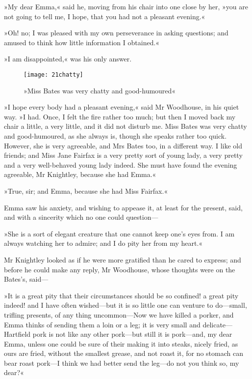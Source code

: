 »My dear Emma,« said he, moving from his chair into one close by her, »you are not going to tell me, I hope, that you had not a pleasant evening.«

»Oh! no; I was pleased with my own perseverance in asking questions; and amused to think how little information I obtained.«

»I am disappointed,« was his only answer.

\begin{figure}[tbph]
\centering
\texttt{[image: 21chatty]}
\caption{»Miss Bates was very chatty and good-humoured«}
\end{figure}

»I hope every body had a pleasant evening,« said Mr Woodhouse, in his quiet way. »I had. Once, I felt the fire rather too much; but then I moved back my chair a little, a very little, and it did not disturb me. Miss Bates was very chatty and good-humoured, as she always is, though she speaks rather too quick. However, she is very agreeable, and Mrs Bates too, in a different way. I like old friends; and Miss Jane Fairfax is a very pretty sort of young lady, a very pretty and a very well-behaved young lady indeed. She must have found the evening agreeable, Mr Knightley, because she had Emma.«

»True, sir; and Emma, because she had Miss Fairfax.«

Emma saw his anxiety, and wishing to appease it, at least for the present, said, and with a sincerity which no one could question—

»She is a sort of elegant creature that one cannot keep one's eyes from. I am always watching her to admire; and I do pity her from my heart.«

Mr Knightley looked as if he were more gratified than he cared to express; and before he could make any reply, Mr Woodhouse, whose thoughts were on the Bates's, said—

»It is a great pity that their circumstances should be so confined! a great pity indeed! and I have often wished—but it is so little one can venture to do—small, trifling presents, of any thing uncommon—Now we have killed a porker, and Emma thinks of sending them a loin or a leg; it is very small and delicate—Hartfield pork is not like any other pork—but still it is pork—and, my dear Emma, unless one could be sure of their making it into steaks, nicely fried, as ours are fried, without the smallest grease, and not roast it, for no stomach can bear roast pork—I think we had better send the leg—do not you think so, my dear?«

